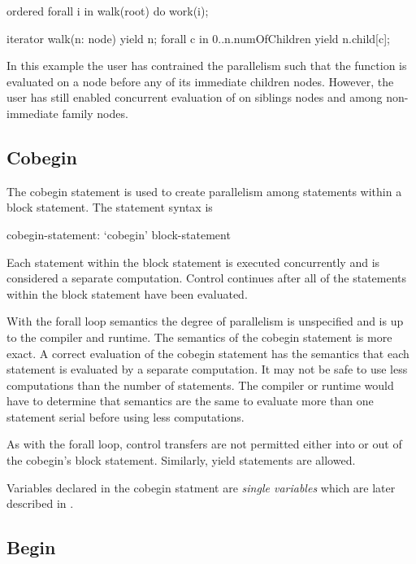 \begin{example}
\begin{chapel}
ordered forall i in walk(root) do
  work(i);

iterator walk(n: node) {
  yield n;
  forall c in 0..n.numOfChildren {
      yield n.child[c];
  }
}
\end{chapel}
In this example the user has contrained the parallelism such that the
function  is evaluated on a node before any of its
immediate children nodes.  However, the user has still enabled concurrent
evaluation of  on siblings nodes and among non-immediate
family nodes.
\end{example}


\subsection{Cobegin}
\label{Cobegin}

The cobegin statement is used to create parallelism among statements
within a block statement. The  statement syntax is
\begin{syntax}
cobegin-statement:
  `cobegin' block-statement
\end{syntax}
Each statement within the block statement is executed concurrently and
is considered a separate computation. Control continues after all of
the statements within the block statement have been evaluated.

With the forall loop semantics the degree of parallelism is
unspecified and is up to the compiler and runtime. The semantics of
the cobegin statement is more exact. A correct evaluation of the
cobegin statement has the semantics that each statement is evaluated
by a separate computation. It may not be safe to use less computations
than the number of statements. The compiler or runtime would have to
determine that semantics are the same to evaluate more than one
statement serial before using less computations.

As with the forall loop, control transfers are not permitted
either into or out of the cobegin's block statement. Similarly,
yield statements are allowed.

Variables declared in the cobegin statment are {\em single variables}
which are later described in .


\subsection{Begin}
\label{Begin}

